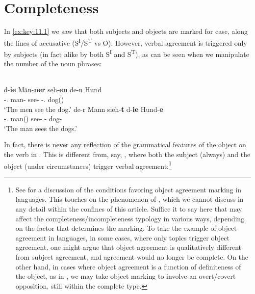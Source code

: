 \documentclass[output=paper]{langsci/langscibook}
\begin{document}
\section{Completeness}\label{sec:key:11.2}

In  \eqref{ex:key:11.1} we saw that both subjects and objects are marked for case, along
the lines of accusative  (S\textsuperscript{I}/S\textsuperscript{T} vs
O). However, verbal agreement is triggered only by subjects (in fact alike by
both S\textsuperscript{I} and S\textsuperscript{T}), as can be seen when we
manipulate the number of the noun phrases:

\ea%
    \label{ex:key:11.4}\\
	\ea
		\gll d-\textbf{ie}        Män-\textbf{ner}  seh-\textbf{en}  de-n      Hund\\
			\Det-\Nom.\Pl{}  man-\Pl{}    see-\Pl{} \Det-\glossN.\Acc{}  dog(\glossN)\\
		\glt ‘The men see the dog.’
	\ex
		\gll de-r        Mann    sieh-\textbf{t}  d-\textbf{ie}      Hund-\textbf{e}\\
			\Det-\M.\Nom{}  man(\M{})  see-\Tsg{} \Det-\Acc{}  dog-\Pl{}\\
		\glt ‘The man sees the dogs.’
	\z
\z

In fact, there is never any reflection of the grammatical features of the
object on the verb in . This is different from, say, , where both
the subject (always) and the object (under circumstances) trigger verbal
agreement:\footnote{See \citet[235--236]{Creissels2000} for a discussion of the
    conditions favoring object agreement marking in  languages. This
    touches on the phenomenon of , which we cannot
    discuss in any detail within the confines of this article. Suffice it to
    say here that  may affect the
    completeness/incompleteness typology in various ways, depending on the
    factor that determines the marking. To take the example of object agreement
    in  languages, in some cases, where only topics trigger object
    agreement, one might argue that object agreement is qualitatively different
    from subject agreement, and agreement would no longer be complete. On the
    other hand, in cases where object agreement is a function of definiteness
of the object, as in , we may take object marking to involve an
overt/covert opposition, still within the complete type.}\newpage
\end{document}
